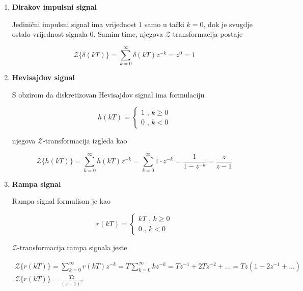 \documentclass[12pt]{IEEEtran}
\numberwithin{equation}{subsection}
\numberwithin{figure}{section}
\begin{document}
\begin{enumerate}
    \item \textbf{Dirakov impulsni signal}
    
    Jedini\v{c}ni impulsni signal ima vrijednost $1$ samo u ta\v{c}ki $k = 0$, 
    dok je svugdje ostalo vrijednost signala $0$. Samim time, njegova 
    $\mathcal{Z}$-transformacija postaje

    \begin{equation}
        \mathcal{Z}\{\delta(kT)\} = \sum_{k = 0}^{\infty}{\delta(kT)z^{-k}} = z^{0} = 1
    \end{equation}

    \item \textbf{Hevisajdov signal}
    
    S obzirom da diskretizovan Hevisajdov signal ima formulaciju 

    \begin{equation}
        h(kT) = \begin{cases}
            1 \text{ , } k \geq 0\\
            0 \text{ , } k < 0
        \end{cases}
    \end{equation}

    njegova $\mathcal{Z}$-transformacija izgleda kao

    \begin{equation}
        \mathcal{Z}\{h(kT)\} = \sum_{k = 0}^{\infty}{h(kT)z^{-k}} = \sum_{k = 0}^{\infty}{1 \cdot z^{-k}} = \frac{1}{1 - z^{-k}} = \frac{z}{z - 1}
    \end{equation}
    
    \item \textbf{Rampa signal}
    
    Rampa signal formulisan je kao 

    \begin{equation}
        r(kT) = \begin{cases}
            kT \text{ , } k \geq 0\\
            0 \text{ , } k < 0
        \end{cases}
    \end{equation}

    $\mathcal{Z}$-transformacija rampa signala jeste 

    \begin{gather}
        \mathcal{Z}\{r(kT)\} = \sum_{k = 0}^{\infty}{r(kT)z^{-k}} = T\sum_{k = 0}^{\infty}{kz^{-k}} = Tz^{-1} + 2Tz^{-2} + ... = Tz(1 + 2z^{-1} + ...)\\
        \mathcal{Z}\{r(kT)\} = \frac{Tz}{(z-1)^{2}}
    \end{gather}

\end{enumerate}
\end{document}
